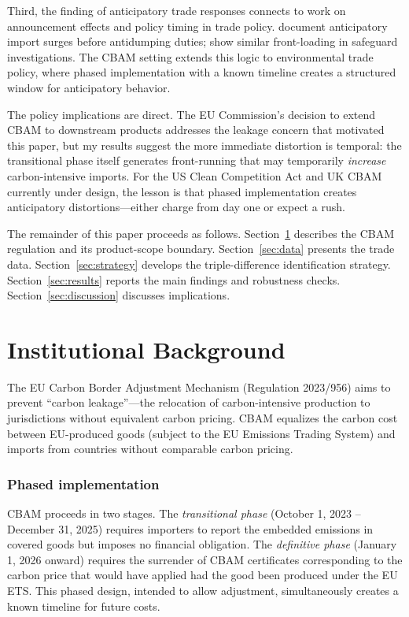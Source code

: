 \documentclass[12pt]{article}
\begin{document}
Third, the finding of anticipatory trade responses connects to work on announcement effects and policy timing in trade policy. \citet{staiger_wolak_1994} document anticipatory import surges before antidumping duties; \citet{besedes_prusa_2017} show similar front-loading in safeguard investigations. The CBAM setting extends this logic to environmental trade policy, where phased implementation with a known timeline creates a structured window for anticipatory behavior.

The policy implications are direct. The EU Commission's decision to extend CBAM to downstream products addresses the leakage concern that motivated this paper, but my results suggest the more immediate distortion is temporal: the transitional phase itself generates front-running that may temporarily \emph{increase} carbon-intensive imports. For the US Clean Competition Act and UK CBAM currently under design, the lesson is that phased implementation creates anticipatory distortions---either charge from day one or expect a rush.

The remainder of this paper proceeds as follows. Section~\ref{sec:background} describes the CBAM regulation and its product-scope boundary. Section~\ref{sec:data} presents the trade data. Section~\ref{sec:strategy} develops the triple-difference identification strategy. Section~\ref{sec:results} reports the main findings and robustness checks. Section~\ref{sec:discussion} discusses implications.


\section{Institutional Background}
\label{sec:background}

The EU Carbon Border Adjustment Mechanism (Regulation 2023/956) aims to prevent ``carbon leakage''---the relocation of carbon-intensive production to jurisdictions without equivalent carbon pricing. CBAM equalizes the carbon cost between EU-produced goods (subject to the EU Emissions Trading System) and imports from countries without comparable carbon pricing.

\subsubsection*{Phased implementation} CBAM proceeds in two stages. The \emph{transitional phase} (October 1, 2023 -- December 31, 2025) requires importers to report the embedded emissions in covered goods but imposes no financial obligation. The \emph{definitive phase} (January 1, 2026 onward) requires the surrender of CBAM certificates corresponding to the carbon price that would have applied had the good been produced under the EU ETS. This phased design, intended to allow adjustment, simultaneously creates a known timeline for future costs.
\end{document}
